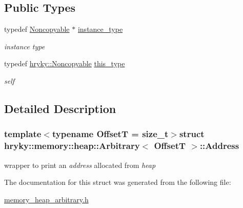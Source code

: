 \subsection*{Public Types}
\begin{DoxyCompactItemize}
\item 
\hypertarget{classhryky_1_1_noncopyable_aaf87abb55f700af85ecb0895f6178821}{typedef \hyperlink{classhryky_1_1_noncopyable}{Noncopyable} $\ast$ \hyperlink{classhryky_1_1_noncopyable_aaf87abb55f700af85ecb0895f6178821}{instance\-\_\-type}}\label{classhryky_1_1_noncopyable_aaf87abb55f700af85ecb0895f6178821}

\begin{DoxyCompactList}\small\item\em instance type \end{DoxyCompactList}\item 
\hypertarget{classhryky_1_1_noncopyable_acf13ad1c98a76247a561dff514979da5}{typedef \hyperlink{classhryky_1_1_noncopyable}{hryky\-::\-Noncopyable} \hyperlink{classhryky_1_1_noncopyable_acf13ad1c98a76247a561dff514979da5}{this\-\_\-type}}\label{classhryky_1_1_noncopyable_acf13ad1c98a76247a561dff514979da5}

\begin{DoxyCompactList}\small\item\em self \end{DoxyCompactList}\end{DoxyCompactItemize}


\subsection{Detailed Description}
\subsubsection*{template$<$typename Offset\-T = size\-\_\-t$>$struct hryky\-::memory\-::heap\-::\-Arbitrary$<$ Offset\-T $>$\-::\-Address}

wrapper to print an {\itshape address\/} allocated from {\itshape heap\/} 

The documentation for this struct was generated from the following file\-:\begin{DoxyCompactItemize}
\item 
\hyperlink{memory__heap__arbitrary_8h}{memory\-\_\-heap\-\_\-arbitrary.\-h}\end{DoxyCompactItemize}
